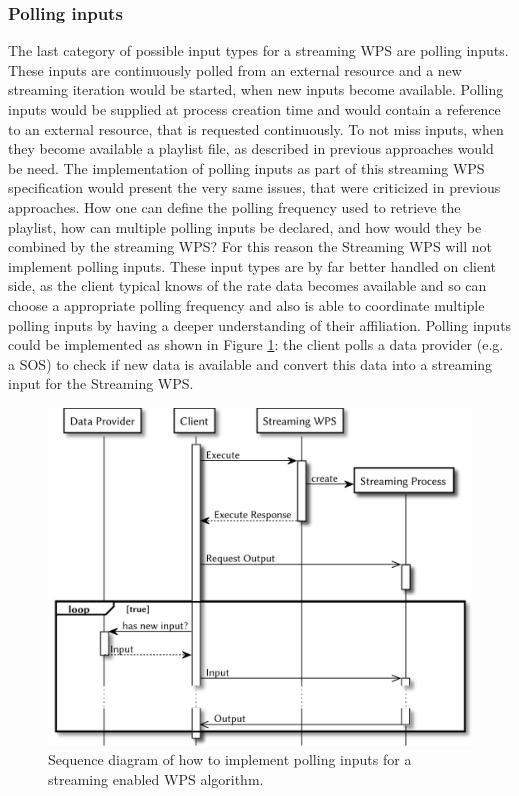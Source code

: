 		\subsubsection{Polling inputs}
			\label{sec:stream:input:polling}
			The last category of possible input types for a streaming \ac{WPS} are polling inputs. These inputs are continuously polled from an external resource and a new streaming iteration would be started, when new inputs become available. Polling inputs would be supplied at process creation time and would contain a reference to an external resource, that is requested continuously. To not miss inputs, when they become available a playlist file, as described in previous approaches \citep{foerster2012live} would be need. The implementation of polling inputs as part of this streaming \ac{WPS} specification would present the very same issues, that were criticized in previous approaches. How one can define the polling frequency used to retrieve the playlist, how can multiple polling inputs be declared, and how would they be combined by the streaming \ac{WPS}? For this reason the Streaming \ac{WPS} will not implement polling inputs. These input types are by far better handled on client side, as the client typical knows of the rate data becomes available and so can choose a appropriate polling frequency and also is able to coordinate multiple polling inputs by having a deeper understanding of their affiliation. Polling inputs could be implemented as shown in Figure \ref{fig:sd:polling}: the client polls a data provider (e.g. a \ac{SOS}) to check if new data is available and convert this data into a streaming input for the Streaming \ac{WPS}.
			\begin{figure}[!htb]
				\centering
				\includegraphics[width=.7868\textwidth]{figures/sequence-diagramm-polling.pdf}
				\caption{\label{fig:sd:polling} Sequence diagram of how to implement polling inputs for a streaming enabled WPS algorithm.}
			\end{figure}

